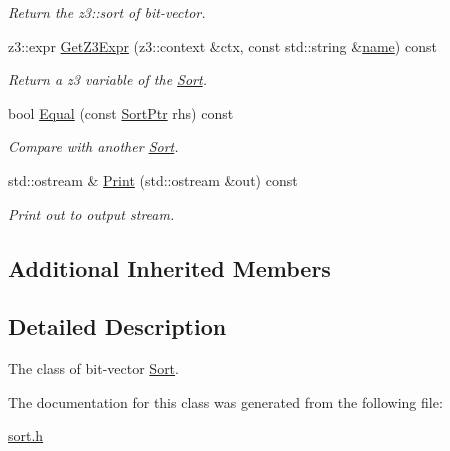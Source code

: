 \begin{DoxyCompactItemize}
\begin{DoxyCompactList}\small\item\em Return the z3\+::sort of bit-\/vector. \end{DoxyCompactList}\item 
\mbox{\label{classilang_1_1_sort_bv_ae0d11a358273c746b86ddcfb80ca75fd}} 
z3\+::expr \mbox{\hyperlink{classilang_1_1_sort_bv_ae0d11a358273c746b86ddcfb80ca75fd}{Get\+Z3\+Expr}} (z3\+::context \&ctx, const std\+::string \&\mbox{\hyperlink{classilang_1_1_object_acf20b072e69f572910d7d80c93af0b38}{name}}) const
\begin{DoxyCompactList}\small\item\em Return a z3 variable of the \mbox{\hyperlink{classilang_1_1_sort}{Sort}}. \end{DoxyCompactList}\item 
\mbox{\label{classilang_1_1_sort_bv_a34522030a79a58395c235cabfe577546}} 
bool \mbox{\hyperlink{classilang_1_1_sort_bv_a34522030a79a58395c235cabfe577546}{Equal}} (const \mbox{\hyperlink{classilang_1_1_sort_a8b9cc5e381404211a1c0423327866d3b}{Sort\+Ptr}} rhs) const
\begin{DoxyCompactList}\small\item\em Compare with another \mbox{\hyperlink{classilang_1_1_sort}{Sort}}. \end{DoxyCompactList}\item 
\mbox{\label{classilang_1_1_sort_bv_a4950b7ca7d92f7b180bb158f22df7ad4}} 
std\+::ostream \& \mbox{\hyperlink{classilang_1_1_sort_bv_a4950b7ca7d92f7b180bb158f22df7ad4}{Print}} (std\+::ostream \&out) const
\begin{DoxyCompactList}\small\item\em Print out to output stream. \end{DoxyCompactList}\end{DoxyCompactItemize}
\subsection*{Additional Inherited Members}


\subsection{Detailed Description}
The class of bit-\/vector \mbox{\hyperlink{classilang_1_1_sort}{Sort}}. 

The documentation for this class was generated from the following file\+:\begin{DoxyCompactItemize}
\item 
\mbox{\hyperlink{sort_8h}{sort.\+h}}\end{DoxyCompactItemize}
